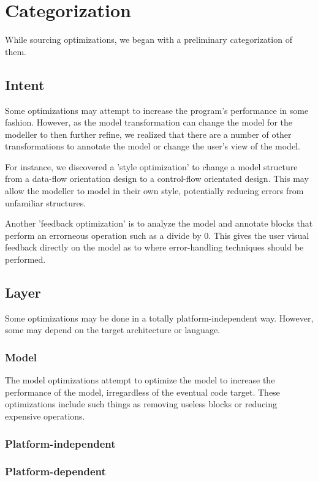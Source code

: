 \section{Categorization}

While sourcing optimizations, we began with a preliminary categorization of them. 

\subsection{Intent}

Some optimizations may attempt to increase the program's performance in some fashion. However, as the model transformation can change the model for the modeller to then further refine, we realized that there are a number of other transformations to annotate the model or change the user's view of the model.

For instance, we discovered a 'style optimization' to change a model structure from a data-flow orientation design to a control-flow orientated design.  This may allow the modeller to model in their own style, potentially reducing errors from unfamiliar structures.

Another 'feedback optimization' is to analyze the model and annotate blocks that perform an errorneous operation such as a divide by 0. This gives the user visual feedback directly on the model as to where error-handling techniques should be performed.

\subsection{Layer}
Some optimizations may be done in a totally platform-independent way. However, some may depend on the target architecture or language.

\subsubsection{Model}
The model optimizations attempt to optimize the model to increase the performance of the model, irregardless of the eventual code target. These optimizations include such things as removing useless blocks or reducing expensive operations.

\subsubsection{Platform-independent}
\subsubsection{Platform-dependent}
